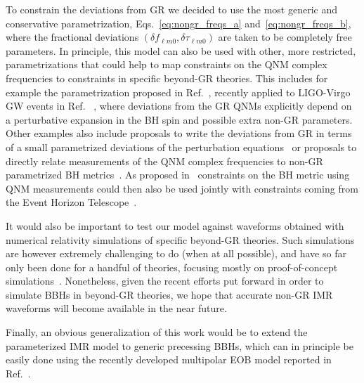 To constrain the deviations from GR we decided to use the most generic and conservative parametrization, Eqs.~\eqref{eq:nongr_freqs_a} and~\eqref{eq:nongr_freqs_b}, where the fractional deviations $(\delta f_{\ell m0},\delta \tau_{\ell m0})$ are taken to be completely free parameters. In principle, this model can also be used with other, more restricted, parametrizations that could help to map constraints on the QNM complex frequencies to constraints in specific beyond-GR theories. This includes for example the parametrization proposed in Ref.~\cite{Maselli:2019mjd}, recently applied to LIGO-Virgo GW events in Ref. ~\cite{Carullo:2021dui}, where deviations from the GR QNMs explicitly depend on a perturbative expansion in the BH spin and possible extra non-GR parameters. Other examples also include proposals to write the deviations from GR in terms of a small parametrized deviations of the perturbation equations~\cite{Cardoso:2019mqo,McManus:2019ulj} or proposals to directly relate measurements of the QNM complex frequencies to non-GR parametrized BH metrics~\cite{Glampedakis:2017dvb,Suvorov:2021amy,Volkel:2020daa}. As proposed in~\cite{Volkel:2020daa,Volkel:2020xlc} constraints on the BH metric using QNM measurements could then also be used jointly with constraints coming from the Event Horizon Telescope~\cite{Volkel:2020xlc,Psaltis:2020lvx,Yang:2021zqy}.

It would also be important to test our model against waveforms obtained with numerical relativity simulations of specific beyond-GR theories. Such simulations are however extremely challenging to do (when at all possible), and have so far only been done for a handful of theories, focusing mostly on proof-of-concept simulations~\cite{Healy:2011ef,Berti:2013gfa,Cao:2013osa,Okounkova:2017yby,Hirschmann:2017psw,Witek:2018dmd,Okounkova:2019dfo,Okounkova:2019zjf,Okounkova:2020rqw,East:2020hgw}. Nonetheless, given the recent efforts put forward in order to simulate BBHs in beyond-GR theories, we hope that accurate non-GR IMR waveforms will become available in the near future.

Finally, an obvious generalization of this work would be to extend the parameterized IMR model to generic precessing BBHs, which can in principle be easily done using the recently developed multipolar EOB model reported in Ref.~\cite{Ossokine:2020kjp}.
